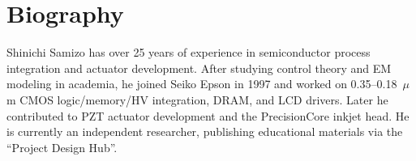 \documentclass[conference]{IEEEtran}
\begin{document}
\section*{Biography}
\small
Shinichi Samizo has over 25 years of experience in semiconductor process integration and actuator development. After studying control theory and EM modeling in academia, he joined Seiko Epson in 1997 and worked on 0.35--0.18~$\mu$m CMOS logic/memory/HV integration, DRAM, and LCD drivers. Later he contributed to PZT actuator development and the PrecisionCore inkjet head. He is currently an independent researcher, publishing educational materials via the ``Project Design Hub''.
\end{document}
